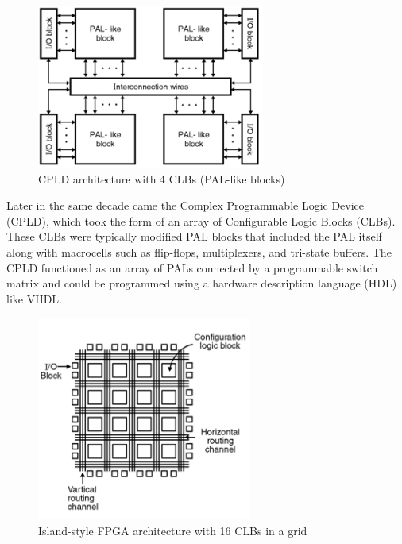 \documentclass[twocolumn]{article}
\begin{document}
    \begin{figure}
        \centering
        \includegraphics[width=7.5cm]{figures/cpld.png}
        \caption{CPLD architecture with 4 CLBs (PAL-like blocks)}
        \label{fig:cpld}
    \end{figure}

    Later in the same decade came the Complex Programmable Logic Device (CPLD), which took the form of an array of Configurable Logic Blocks (CLBs). 
    These CLBs were typically modified PAL blocks that included the PAL itself along with macrocells such as flip-flops, multiplexers, and tri-state buffers. 
    The CPLD functioned as an array of PALs connected by a programmable switch matrix and could be programmed using a hardware description language (HDL) like VHDL. 

    \begin{figure}
        \centering
        \includegraphics[width=7.0cm]{figures/fpga.png}
        \caption{Island-style FPGA architecture with 16 CLBs in a grid}
        \label{fig:fpga}
    \end{figure}
\end{document}
